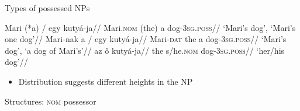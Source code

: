 \documentclass[12pt]{beamer}
\begin{document}
\begin{frame}{Types of possessed NPs}

\pex
    \a
        \begingl{}
            \gla    Mari {(*a) /} egy kutyá-ja//
            \glb    Mari.\textsc{nom} (the) a dog-\textsc{3sg.poss}//
            \glft   `Mari's dog', `Mari's one dog'//
        \endgl
    \pause
    \a
        \begingl{}
            \gla    Mari-nak {a /} egy kutyá-ja//
            \glb    Mari-\textsc{dat} the a dog-\textsc{3sg.poss}//
            \glft   `Mari's dog', `a dog of Mari's'//
        \endgl
    \pause
    \a
        \begingl{}
            \gla    az ő kutyá-ja//
            \glb    the s/he.\textsc{nom} dog-\textsc{3sg.poss}//
            \glft   `her/his dog'//
        \endgl
\xe

\pause

\begin{itemize}

    \item Distribution suggests different heights in the NP
        \parencite{Szabolcsi1994,denDikken1999,Bartos1999,EKiss2000b,Dekany2015}

\end{itemize}

\end{frame}

\begin{frame}{Structures: \textsc{nom} possessor}

\ex{}
\xe

\end{frame}
\end{document}
